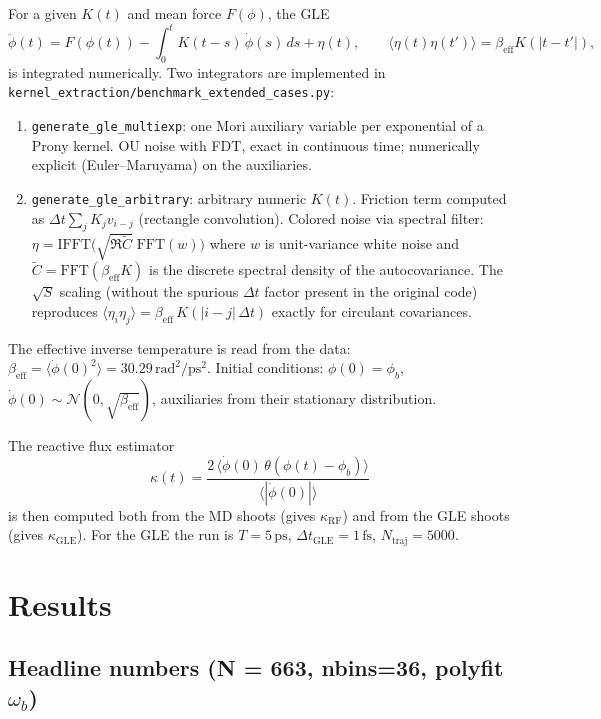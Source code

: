 \documentclass[11pt]{article}
\newcommand{\rad}{\mathrm{rad}}
\newcommand{\ps}{\mathrm{ps}}
\newcommand{\fs}{\mathrm{fs}}
\newcommand{\RF}{\mathrm{RF}}
\newcommand{\GLE}{\mathrm{GLE}}
\begin{document}
For a given $K(t)$ and mean force $F(\phi)$, the GLE
\begin{equation}
\ddot{\phi}(t) = F(\phi(t))
- \int_0^t K(t-s)\,\dot\phi(s)\,ds + \eta(t),
\qquad
\langle \eta(t)\eta(t') \rangle = \beta_\mathrm{eff} K(|t-t'|),
\end{equation}
is integrated numerically. Two integrators are implemented in
\texttt{kernel\_extraction/benchmark\_extended\_cases.py}:
\begin{enumerate}
\item \texttt{generate\_gle\_multiexp}: one Mori auxiliary variable per
exponential of a Prony kernel. OU noise with FDT, exact in continuous
time; numerically explicit (Euler--Maruyama) on the auxiliaries.
\item \texttt{generate\_gle\_arbitrary}: arbitrary numeric $K(t)$.
Friction term computed as $\Delta t \sum_j K_j v_{i-j}$
(rectangle convolution). Colored noise via spectral filter:
$\eta = \mathrm{IFFT}\bigl(\sqrt{\Re\widetilde{C}}\;
\mathrm{FFT}(w)\bigr)$ where $w$ is unit-variance white noise and
$\widetilde{C} = \mathrm{FFT}(\beta_\mathrm{eff} K)$ is the discrete
spectral density of the autocovariance. The
$\sqrt{S}$ scaling (without the spurious $\Delta t$ factor present in
the original code) reproduces $\langle \eta_i \eta_j \rangle =
\beta_\mathrm{eff}\, K(|i-j|\,\Delta t)$ exactly for circulant
covariances.
\end{enumerate}
The effective inverse temperature is read from the data:
$\beta_\mathrm{eff} = \langle \dot\phi(0)^2 \rangle = 30.29\,\rad^2/\ps^2$.
Initial conditions: $\phi(0) = \phi_b$, $\dot\phi(0) \sim
\mathcal{N}(0,\sqrt{\beta_\mathrm{eff}})$, auxiliaries from their
stationary distribution.

The reactive flux estimator
\begin{equation}
\kappa(t) = \frac{2\,\langle \dot\phi(0)\,
\theta(\phi(t) - \phi_b)\rangle}{\langle |\dot\phi(0)| \rangle}
\end{equation}
is then computed both from the MD shoots (gives $\kappa_\RF$) and from
the GLE shoots (gives $\kappa_\GLE$). For the GLE the run is
$T = 5\,\ps$, $\Delta t_\mathrm{GLE} = 1\,\fs$, $N_\mathrm{traj} = 5000$.

\section{Results}

\subsection{Headline numbers (N = 663, nbins=36, polyfit $\omega_b$)}
\end{document}
